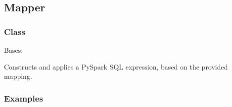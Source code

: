 \documentclass[a4paper,10pt, twoside,english]{sphinxmanual}
\begin{document}
\subsection{Mapper}
\label{\detokenize{transformer/mapper:mapper}}\label{\detokenize{transformer/mapper::doc}}

\subsubsection{Class}
\label{\detokenize{transformer/mapper:module-spooq2.transformer.mapper}}\label{\detokenize{transformer/mapper:class}}

\begin{fulllineitems}
\label{\detokenize{transformer/mapper:spooq2.transformer.mapper.Mapper}}
Bases: {\hyperref[\detokenize{base_classes/transformer:spooq2.transformer.transformer.Transformer}]{}}

Constructs and applies a PySpark SQL expression, based on the provided mapping.
\subsubsection*{Examples}


\end{fulllineitems}
\end{document}

